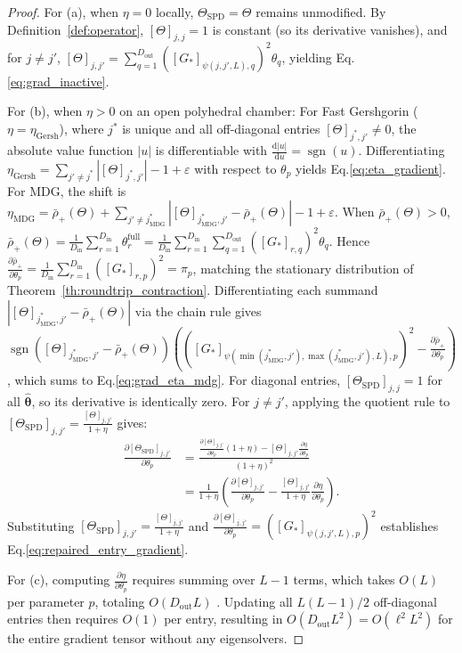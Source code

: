 \documentclass[default,sn-mathphys,Numbered]{sn-jnl}
\theoremstyle{thmstyleone}
\theoremstyle{thmstylethree}
\theoremstyle{thmstyletwo}
\newcommand{\inp}{\text{in}}
\newcommand{\outp}{\text{out}}
\newcommand{\eqnref}[1]{\eqref{#1}}
\begin{document}
\begin{proof}
For (a), when $\eta = 0$ locally, $\Theta_{\mathrm{SPD}} = \Theta$ remains unmodified. By Definition~\ref{def:operator}, $[\Theta]_{j, j} = 1$ is constant (so its derivative vanishes), and for $j \neq j'$, $[\Theta]_{j, j'} = \sum_{q=1}^{D_{\outp}} ([G_*]_{\psi(j, j', L), q})^2 \theta_q$, yielding Eq.\eqnref{eq:grad_inactive}.

For (b), when $\eta > 0$ on an open polyhedral chamber:
For Fast Gershgorin ($\eta = \eta_{\mathrm{Gersh}}$), where $j^*$ is unique and all off-diagonal entries $[\Theta]_{j^*, j'} \neq 0$, the absolute value function $|u|$ is differentiable with $\frac{\mathrm{d}|u|}{\mathrm{d}u} = \operatorname{sgn}(u)$. Differentiating $\eta_{\mathrm{Gersh}} = \sum_{j' \neq j^*} |[\Theta]_{j^*, j'}| - 1 + \varepsilon$ with respect to $\theta_p$ yields Eq.\eqnref{eq:eta_gradient}.
For MDG, the shift is $\eta_{\mathrm{MDG}} = \bar{\rho}_+(\Theta) + \sum_{j' \neq j_{\mathrm{MDG}}^*} |[\Theta]_{j_{\mathrm{MDG}}^*, j'} - \bar{\rho}_+(\Theta)| - 1 + \varepsilon$. When $\bar{\rho}_+(\Theta) > 0$, $\bar{\rho}_+(\Theta) = \frac{1}{D_{\inp}} \sum_{r=1}^{D_{\inp}} \theta_r^{\mathrm{full}} = \frac{1}{D_{\inp}} \sum_{r=1}^{D_{\inp}} \sum_{q=1}^{D_{\outp}} ([G_*]_{r, q})^2 \theta_q$. Hence $\frac{\partial \bar{\rho}_+}{\partial \theta_p} = \frac{1}{D_{\inp}} \sum_{r=1}^{D_{\inp}} ([G_*]_{r, p})^2 = \pi_p$, matching the stationary distribution of Theorem~\ref{th:roundtrip_contraction}. Differentiating each summand $|[\Theta]_{j_{\mathrm{MDG}}^*, j'} - \bar{\rho}_+(\Theta)|$ via the chain rule gives $\operatorname{sgn}([\Theta]_{j_{\mathrm{MDG}}^*, j'} - \bar{\rho}_+(\Theta)) \left( ([G_*]_{\psi(\min(j_{\mathrm{MDG}}^*, j'), \max(j_{\mathrm{MDG}}^*, j'), L), p})^2 - \frac{\partial \bar{\rho}_+}{\partial \theta_p} \right)$, which sums to Eq.\eqnref{eq:grad_eta_mdg}.
For diagonal entries, $[\Theta_{\mathrm{SPD}}]_{j, j} = 1$ for all $\hat{\bm{\theta}}$, so its derivative is identically zero. For $j \neq j'$, applying the quotient rule to $[\Theta_{\mathrm{SPD}}]_{j, j'} = \frac{[\Theta]_{j, j'}}{1 + \eta}$ gives:
\begin{align}
\frac{\partial [\Theta_{\mathrm{SPD}}]_{j, j'}}{\partial \theta_p} &= \frac{\frac{\partial [\Theta]_{j, j'}}{\partial \theta_p} (1 + \eta) - [\Theta]_{j, j'} \frac{\partial \eta}{\partial \theta_p}}{(1 + \eta)^2} \nonumber \\
&= \frac{1}{1 + \eta} \left( \frac{\partial [\Theta]_{j, j'}}{\partial \theta_p} - \frac{[\Theta]_{j, j'}}{1 + \eta} \frac{\partial \eta}{\partial \theta_p} \right).
\end{align}
Substituting $[\Theta_{\mathrm{SPD}}]_{j, j'} = \frac{[\Theta]_{j, j'}}{1 + \eta}$ and $\frac{\partial [\Theta]_{j, j'}}{\partial \theta_p} = ([G_*]_{\psi(j, j', L), p})^2$ establishes Eq.\eqnref{eq:repaired_entry_gradient}.

For (c), computing $\frac{\partial \eta}{\partial \theta_p}$ requires summing over $L-1$ terms, which takes $O(L)$  per parameter $p$, totaling $O(D_{\outp} L)$ . Updating all $L(L-1)/2$ off-diagonal entries then requires $O(1)$  per entry, resulting in $O(D_{\outp} L^2) = O(\ell^2 L^2)$  for the entire gradient tensor without any eigensolvers.
\end{proof}
\end{document}
